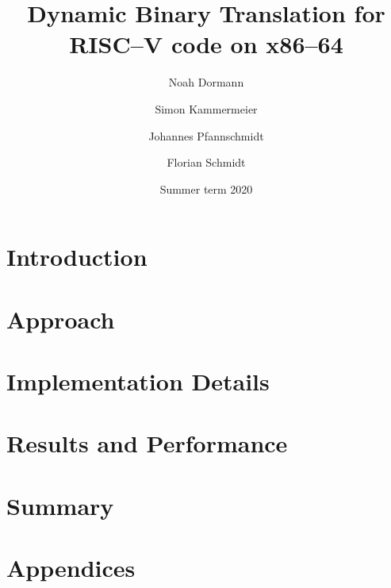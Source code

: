 \documentclass[course=eragp]{aspdoc}
\author{Noah Dormann \and Simon Kammermeier \and Johannes Pfannschmidt \and Florian Schmidt}
\date{Summer term 2020}
\title{Dynamic Binary Translation for RISC--V code on x86--64}
\begin{document}
\maketitle
\tableofcontents
\pagebreak


\section{Introduction}


\section{Approach}


\section{Implementation Details}


\section{Results and Performance}


\section{Summary}


\newpage
\section*{Appendices}
\begin{appendices}	
	\renewcommand\thesubsection{\Alph{subsection}}
	
\end{appendices}

\newpage
\listoftables
\listoffigures

\newpage

{}
\end{document}
